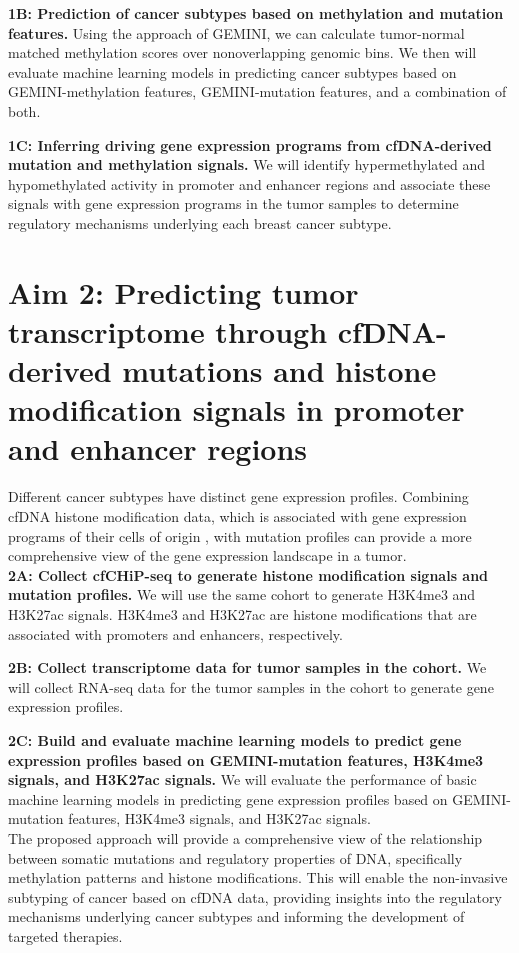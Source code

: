 \documentclass[11pt]{article}
\begin{document}
\noindent \textbf{1B: Prediction of cancer subtypes based on methylation and mutation features.}
Using the approach of GEMINI, we can calculate tumor-normal matched methylation scores over nonoverlapping genomic bins. We then will evaluate machine learning models in predicting cancer subtypes based on GEMINI-methylation features, GEMINI-mutation features, and a combination of both.

\noindent \textbf{1C: Inferring driving gene expression programs from cfDNA-derived mutation and methylation signals.}
We will identify hypermethylated and hypomethylated activity in promoter and enhancer regions and associate these signals with gene expression programs in the tumor samples to determine regulatory mechanisms underlying each breast cancer subtype.
\section*{Aim 2: Predicting tumor transcriptome through cfDNA-derived mutations and histone modification signals in promoter and enhancer regions}
Different cancer subtypes have distinct gene expression profiles. Combining cfDNA histone modification data, which is associated with gene expression programs of their cells of origin \cite{sadeh_chip-seq_2021, trier_maansson_cell-free_2023}, with mutation profiles can provide a more comprehensive view of the gene expression landscape in a tumor.
\medskip \\
\noindent \textbf{2A: Collect cfCHiP-seq \cite{baca_liquid_2023} to generate histone modification signals and mutation profiles.} We will use the same cohort to generate H3K4me3 and H3K27ac signals. H3K4me3 and H3K27ac are histone modifications that are associated with promoters and enhancers, respectively.

\noindent \textbf{2B: Collect transcriptome data for tumor samples in the cohort.} We will collect RNA-seq data for the tumor samples in the cohort to generate gene expression profiles.

\noindent \textbf{2C: Build and evaluate machine learning models to predict gene expression profiles based on GEMINI-mutation features, H3K4me3 signals, and H3K27ac signals.} We will evaluate the performance of basic machine learning models in predicting gene expression profiles based on GEMINI-mutation features, H3K4me3 signals, and H3K27ac signals. 
\medskip \\
\noindent The proposed approach will provide a comprehensive view of the relationship between somatic mutations and regulatory properties of DNA, specifically methylation patterns and histone modifications. This will enable the non-invasive subtyping of cancer based on cfDNA data, providing insights into the regulatory mechanisms underlying cancer subtypes and informing the development of targeted therapies.
\end{document}
